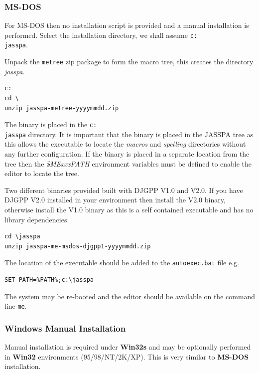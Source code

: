 \documentclass[11pt,a4paper,pdftex]{article}
\begin{document}
\subsubsection{MS-DOS}

    For MS-DOS then no installation script is provided and a manual
    installation is performed. Select the installation directory, we shall
    assume \texttt{c:\\jasspa}.

    Unpack the \texttt{metree} zip package to form the macro tree, this
    creates the directory \textit{jasspa}.

\begin{verbatim}
c:
cd \
unzip jasspa-metree-yyyymmdd.zip
\end{verbatim}

    The binary is placed in the \texttt{c:\\jasspa} directory. It is important
    that the binary is placed in the JASSPA tree as this allows the executable
    to locate the \textit{macros} and \textit{spelling} directories without
    any further configuration. If the binary is placed in a separate location
    from the tree then the \textit{\$MExxxPATH} environment variables must be
    defined to enable the editor to locate the tree.

    Two different binaries provided built with DJGPP V1.0 and V2.0. If you
    have DJGPP V2.0 installed in your environment then install the V2.0
    binary, otherwise install the V1.0 binary as this is a self contained
    executable and has no library dependencies.

\begin{verbatim}
cd \jasspa
unzip jasspa-me-msdos-djgpp1-yyyymmdd.zip
\end{verbatim}

    The location of the executable should be added to the
    \texttt{autoexec.bat} file e.g.

\begin{verbatim}
SET PATH=%PATH%;c:\jasspa
\end{verbatim}

    The system may be re-booted and the editor should be available on the
    command line \texttt{me}.

\subsubsection{Windows Manual Installation}

    Manual installation is required under \textbf{Win32s} and may be
    optionally performed in \textbf{Win32} environments (95/98/NT/2K/XP). This
    is very similar to \textbf{MS-DOS} installation.
\end{document}
